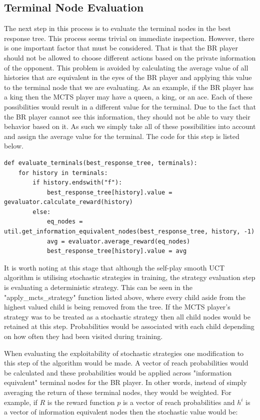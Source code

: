 \subsection{Terminal Node Evaluation}\label{subsec:terminalNodeEvaluation}
The next step in this process is to evaluate the terminal nodes in the best response tree.
This process seems trivial on immediate inspection.
However, there is one important factor that must be considered.
That is that the BR player should not be allowed to choose different actions based on the
private information of the opponent.
This problem is avoided by calculating the average value of all histories that are equivalent in
the eyes of the BR player and applying this value to the terminal node that we are evaluating.
As an example, if the BR player has a king then the MCTS player may have a queen, a king, or an ace.
Each of these possibilities would result in a different value for the terminal.
Due to the fact that the BR player cannot see this information, they should not be able to vary
their behavior based on it.
As such we simply take all of these possibilities into account and assign the average value for
the terminal.
The code for this step is listed below.

\begin{lstlisting}[style=Python]
def evaluate_terminals(best_response_tree, terminals):
    for history in terminals:
        if history.endswith("f"):
            best_response_tree[history].value = gevaluator.calculate_reward(history)
        else:
            eq_nodes = util.get_information_equivalent_nodes(best_response_tree, history, -1)
            avg = evaluator.average_reward(eq_nodes)
            best_response_tree[history].value = avg
\end{lstlisting}

It is worth noting at this stage that although the self-play smooth UCT algorithm is utilising
stochastic strategies in training, the strategy evaluation step is evaluating a deterministic strategy.
This can be seen in the "apply\_mcts\_strategy" function listed above, where every
child aside from the highest valued child is being removed from the tree.
If the MCTS player's strategy was to be treated as a stochastic strategy then all child
nodes would be retained at this step.
Probabilities would be associated with each child depending on how often they had been visited during training.

When evaluating the exploitability of stochastic strategies one
modification to this step of the algorithm would be made.
A vector of reach probabilities\citep{johanson2011accelerating} would be calculated and these probabilities would
be applied across "information equivalent" terminal nodes for the BR player.
In other words, instead of simply averaging the return of these terminal nodes, they would be weighted.
For example, if $R$ is the reward function $p$ is a vector of reach probabilities and
$h^i$ is a vector of information equivalent nodes then the stochastic value would be:


